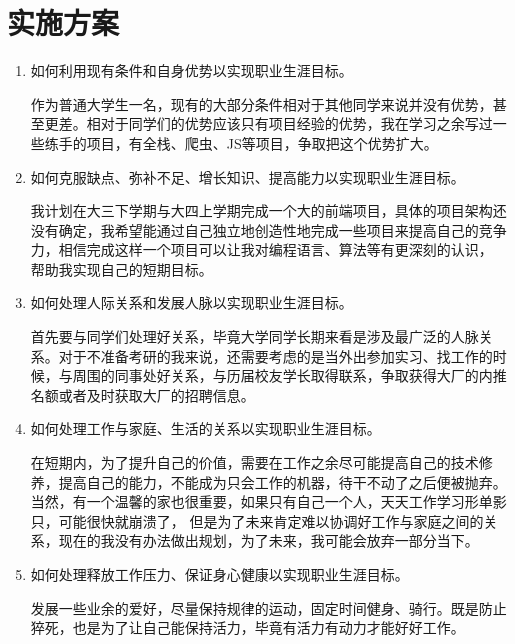 \documentclass{article}
\begin{document}
\section{实施方案}
\begin{enumerate}[1、]
	\item 如何利用现有条件和自身优势以实现职业生涯目标。\par
	作为普通大学生一名，现有的大部分条件相对于其他同学来说并没有优势，甚至更差。相对于同学们的优势应该只有项目经验的优势，我在学习之余写过一些练手的项目，有全栈、爬虫、JS等项目，争取把这个优势扩大。
	\item 如何克服缺点、弥补不足、增长知识、提高能力以实现职业生涯目标。\par
	我计划在大三下学期与大四上学期完成一个大的前端项目，具体的项目架构还没有确定，我希望能通过自己独立地创造性地完成一些项目来提高自己的竞争力，相信完成这样一个项目可以让我对编程语言、算法等有更深刻的认识，
	帮助我实现自己的短期目标。
	\item 如何处理人际关系和发展人脉以实现职业生涯目标。\par
	首先要与同学们处理好关系，毕竟大学同学长期来看是涉及最广泛的人脉关系。对于不准备考研的我来说，还需要考虑的是当外出参加实习、找工作的时候，与周围的同事处好关系，与历届校友学长取得联系，争取获得大厂的内推名额或者及时获取大厂的招聘信息。
	\item 如何处理工作与家庭、生活的关系以实现职业生涯目标。\par
	在短期内，为了提升自己的价值，需要在工作之余尽可能提高自己的技术修养，提高自己的能力，不能成为只会工作的机器，待干不动了之后便被抛弃。当然，有一个温馨的家也很重要，如果只有自己一个人，天天工作学习形单影只，可能很快就崩溃了，
	但是为了未来肯定难以协调好工作与家庭之间的关系，现在的我没有办法做出规划，为了未来，我可能会放弃一部分当下。
	\item 如何处理释放工作压力、保证身心健康以实现职业生涯目标。\par
	发展一些业余的爱好，尽量保持规律的运动，固定时间健身、骑行。既是防止猝死，也是为了让自己能保持活力，毕竟有活力有动力才能好好工作。
\end{enumerate}
\par
\end{document}
